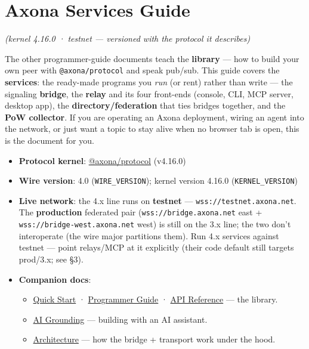 \documentclass[
  nobib]{tufte-handout}
\author{}
\date{}
\providecommand{\tightlist}{%
  \setlength{\itemsep}{0pt}\setlength{\parskip}{0pt}}
\begin{document}
\section{Axona Services Guide}\label{axona-services-guide}

\emph{(kernel 4.16.0 · testnet --- versioned with the protocol it
describes)}

The other programmer-guide documents teach the \textbf{library} --- how
to build your own peer with \texttt{@axona/protocol} and speak pub/sub.
This guide covers the \textbf{services}: the ready-made programs you
\emph{run} (or rent) rather than write --- the signaling
\textbf{bridge}, the \textbf{relay} and its four front-ends (console,
CLI, MCP server, desktop app), the \textbf{directory/federation} that
ties bridges together, and the \textbf{PoW collector}. If you are
operating an Axona deployment, wiring an agent into the network, or just
want a topic to stay alive when no browser tab is open, this is the
document for you.

\begin{itemize}
\tightlist
\item
  \textbf{Protocol kernel}:
  \href{https://github.com/axona-net/axona-protocol}{@axona/protocol}
  (v4.16.0)
\item
  \textbf{Wire version}: 4.0 (\texttt{WIRE\_VERSION}); kernel version
  4.16.0 (\texttt{KERNEL\_VERSION})
\item
  \textbf{Live network}: the 4.x line runs on \textbf{testnet} ---
  \texttt{wss://testnet.axona.net}. The \textbf{production} federated
  pair (\texttt{wss://bridge.axona.net} east +
  \texttt{wss://bridge-west.axona.net} west) is still on the 3.x line;
  the two don't interoperate (the wire major partitions them). Run 4.x
  services against testnet --- point relays/MCP at it explicitly (their
  code default still targets prod/3.x; see §3).
\item
  \textbf{Companion docs}:

  \begin{itemize}
  \tightlist
  \item
    \href{Quick-Start-v4.16.0.md}{Quick Start} ·
    \href{Axona-Programmer-Guide-v4.16.0.md}{Programmer Guide} ·
    \href{Axona-API-Reference-v4.16.0.md}{API Reference} --- the
    library.
  \item
    \href{Axona-AI-Grounding-v4.16.0.md}{AI Grounding} --- building with
    an AI assistant.
  \item
    \href{../architecture/Axona-Architecture.tex}{Architecture} --- how
    the bridge + transport work under the hood.
  \end{itemize}
\end{itemize}
\end{document}
